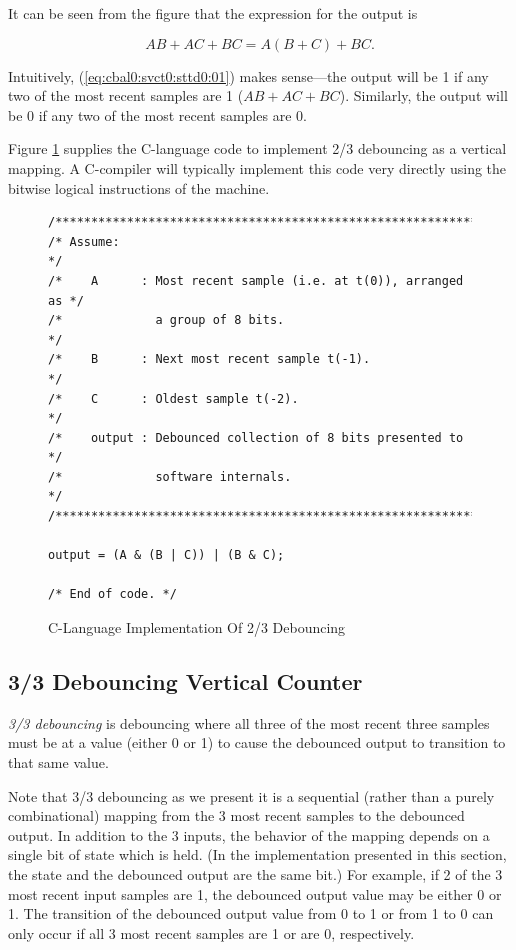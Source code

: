 It can be seen from the figure that the expression for the output is

\begin{equation}
\label{eq:cbal0:svct0:sttd0:01}
AB + AC + BC = A (B+C) + BC .
\end{equation}

Intuitively, (\ref{eq:cbal0:svct0:sttd0:01}) makes sense---the output 
will be 1 if any two of the most recent samples are 1
($AB + AC + BC$).  Similarly, the output will be 0 if any two of
the most recent samples are 0.

Figure \ref{fig:cbal0:svct0:sttd0:02} supplies the C-language
code to implement 2/3 debouncing as a vertical mapping.
A C-compiler will typically implement this code very directly
using the bitwise logical instructions of the machine.

\begin{figure}
\begin{verbatim}
/**************************************************************/
/* Assume:                                                    */
/*    A      : Most recent sample (i.e. at t(0)), arranged as */
/*             a group of 8 bits.                             */
/*    B      : Next most recent sample t(-1).                 */
/*    C      : Oldest sample t(-2).                           */
/*    output : Debounced collection of 8 bits presented to    */
/*             software internals.                            */
/**************************************************************/

output = (A & (B | C)) | (B & C);

/* End of code. */
\end{verbatim}
\caption{C-Language Implementation Of 2/3 Debouncing}
\label{fig:cbal0:svct0:sttd0:02}
\end{figure}

\subsection{3/3 Debouncing Vertical Counter}
\label{cbal0:svct0:sttd1}

\emph{3/3 debouncing} 
is debouncing where all three of the most recent
three samples must be at a value (either 0 or 1) to cause the 
debounced output to transition to that same value.

Note that 3/3 debouncing as we present it is a sequential (rather than
a purely combinational) mapping from the 3 most recent samples to the
debounced output.  In addition to the 3 inputs, the behavior of the
mapping depends on a single bit of state which is held.  (In the
implementation presented in this section, the state and the debounced
output are the same bit.)  For example, if 2 of the 3 most recent
input samples are 1, the debounced output value may be either 0
or 1.  The transition of the debounced output value from
0 to 1 or from 1 to 0 can only occur if all 3 most recent samples
are 1 or are 0, respectively.

